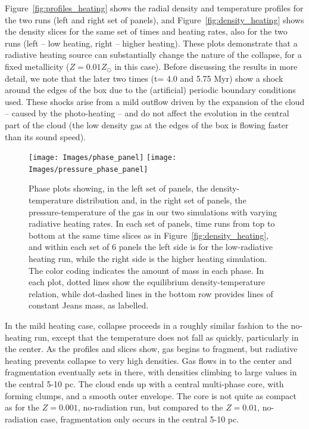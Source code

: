 \documentclass[useAMS,usenatbib]{mn2e}
\begin{document}

Figure~\ref{fig:profiles_heating} shows the radial density and temperature profiles for the two runs (left and right set of panels), and Figure~\ref{fig:density_heating} shows the density slices for the same set of times and heating rates, also for the two runs (left -- low heating, right -- higher heating).  These plots demonstrate that a radiative heating source can substantially change the nature of the collapse, for a fixed metallicity ($Z=0.01 Z_\odot$ in this case).   Before discussing the results in more detail, we note that the later two times (t= 4.0 and 5.75 Myr) show a shock around the edges of the box due to the (artificial) periodic boundary conditions used.   These shocks arise from a mild outflow driven by the expansion of the cloud -- caused by the photo-heating -- and do not affect the evolution in the central part of the cloud (the low density gas at the edges of the box is flowing faster than its sound speed).

\begin{figure}
\begin{center}
\hspace{-0.4cm}
\texttt{[image: Images/phase\_panel]} \hspace{-1cm}
\texttt{[image: Images/pressure\_phase\_panel]} \hspace{-1.5cm}
\end{center}
\caption{\label{fig:phase_panels} Phase plots showing, in the left set of panels, the density-temperature distribution and, in the right set of panels, the pressure-temperature of the gas in our two simulations with varying radiative heating rates.   In each set of panels, time runs from top to bottom at the same time slices as in Figure~\ref{fig:density_heating}, and within each set of 6 panels the left side is for the low-radiative heating run, while the right side is the higher heating simulation.  The color coding indicates the amount of mass in each phase.   In each plot, dotted lines show the equilibrium density-temperature relation, while dot-dashed lines in the bottom row provides lines of constant Jeans mass, as labelled.}
\end{figure}

In the mild heating case, collapse proceeds in a roughly similar fashion to the no-heating run, except that the temperature does not fall as quickly, particularly in the center.  As the profiles and slices show, gas begins to fragment, but radiative heating prevents collapse to very high densities.  Gas flows in to the center and fragmentation eventually sets in there, with densities climbing to large values in the central 5-10 pc.  The cloud ends up with a central multi-phase core, with forming clumps, and a smooth outer envelope.  The core is not quite as compact as for the $Z=0.001$, no-radiation run, but compared to the $Z=0.01$, no-radiation case, fragmentation only occurs in the central 5-10 pc.
\end{document}
